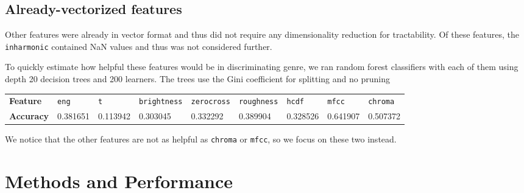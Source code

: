 \documentclass[9pt]{article}
\begin{document}
\subsection{Already-vectorized features}

Other features were already in vector format and thus did not require any dimensionality reduction for tractability. Of these features, the \texttt{inharmonic} contained NaN values and thus was not considered further.

To quickly estimate how helpful these features would be in discriminating genre,
we ran random forest classifiers with each of them using depth 20 decision trees and 200 learners. The trees use the Gini coefficient for splitting and no pruning

\begin{tabular}{l | l | l | l | l | l | l | l | l}
{\bf Feature}	& \texttt{eng}	& \texttt{t}	& \texttt{brightness}	& \texttt{zerocross} 	& \texttt{roughness}	& \texttt{hcdf}	& \texttt{mfcc}	& \texttt{chroma} \\
{\bf Accuracy}	& 0.381651	& 0.113942	& 0.303045		& 0.332292		& 0.389904		& 0.328526	& 0.641907	& 0.507372
\end{tabular}


We notice that the other features are not as helpful as \texttt{chroma} or \texttt{mfcc}, so we focus on these two instead.

\section{Methods and Performance}
\vspace{-0.1in}
\end{document}
